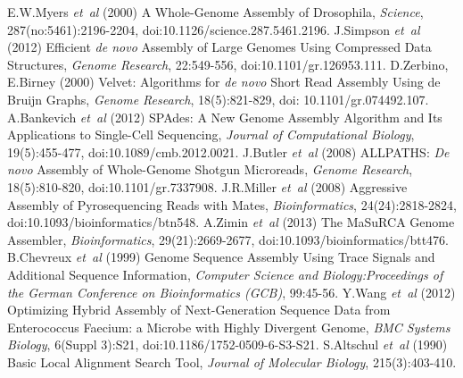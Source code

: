 \documentclass[12pt,a4paper]{cibb}
\begin{document}
\vspace*{-0.3cm}










{\fontsize{10}{10}\selectfont
\begin{thebibliography}{99}
\setlength{\parskip}{0pt}

 E.W.Myers \textit{et~al} (2000) A Whole-Genome Assembly of Drosophila, \textit{Science}, {287(no:5461)}:2196-2204, doi:10.1126/science.287.5461.2196.
 J.Simpson \textit{et~al} (2012) Efficient \textit{de novo} Assembly of Large Genomes Using Compressed Data Structures, \textit{Genome Research}, {22}:549-556, doi:10.1101/gr.126953.111.
 D.Zerbino, E.Birney (2000) Velvet: Algorithms for \textit{de novo} Short Read Assembly Using de Bruijn Graphs, \textit{Genome Research}, {18(5)}:821-829, doi: 10.1101/gr.074492.107.
 A.Bankevich {\it et~al} (2012) SPAdes: A New Genome Assembly Algorithm and Its Applications to Single-Cell Sequencing, \textit{Journal of Computational Biology}, {19(5)}:455-477, doi:10.1089/cmb.2012.0021.
 J.Butler \textit{et~al} (2008) ALLPATHS: \textit{De novo} Assembly of Whole-Genome Shotgun Microreads, {\it Genome Research}, {18(5)}:810-820, doi:10.1101/gr.7337908.
 J.R.Miller \textit{et~al} (2008) Aggressive Assembly of Pyrosequencing Reads with Mates, \textit{Bioinformatics}, {24(24)}:2818-2824, doi:10.1093/bioinformatics/btn548.
 A.Zimin \textit{et~al} (2013) The MaSuRCA Genome Assembler, \textit{Bioinformatics}, {29(21)}:2669-2677, doi:10.1093/bioinformatics/btt476.
 B.Chevreux {\it et~al} (1999) Genome Sequence Assembly Using Trace Signals and Additional Sequence Information, \textit{Computer Science and Biology:Proceedings of the German Conference on Bioinformatics (GCB)}, {99}:45-56.
 Y.Wang {\it et~al} (2012) Optimizing Hybrid Assembly of Next-Generation Sequence Data from Enterococcus Faecium: a Microbe with Highly Divergent Genome, \textit{BMC Systems Biology}, {6(Suppl 3)}:S21, doi:10.1186/1752-0509-6-S3-S21. 
 S.Altschul {\it et~al} (1990) Basic Local Alignment Search Tool, \textit{Journal of Molecular Biology}, {215(3)}:403-410.

\end{thebibliography}
}
\end{document}
